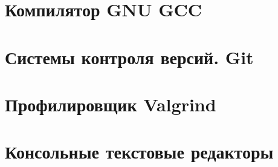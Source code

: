\documentclass{beamer}
\begin{document}
\section{Компилятор GNU GCC}
\begin{frame}
\end{frame}

\section{Системы контроля версий. Git}
\begin{frame}
\end{frame}

\section{Профилировщик Valgrind}
\begin{frame}
\end{frame}

\section{Консольные текстовые редакторы}
\begin{frame}
\end{frame}
\end{document}
